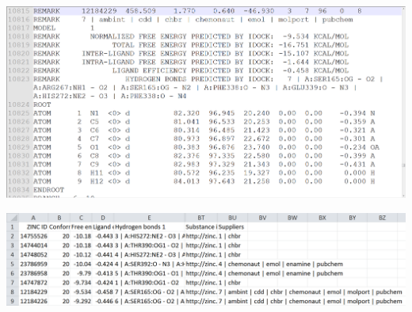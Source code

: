 \documentclass[12pt]{article}
\begin{document}
\clearpage

\begin{center}
\begin{figure}
\centering
{}
\\
\end{figure}
\end{center}

\clearpage

\begin{center}
\includegraphics[width=\linewidth,keepaspectratio=true]{OutputPDBQT.png}
\end{center}

\clearpage

\begin{center}
\includegraphics[width=\linewidth,keepaspectratio=true]{OutputCSV.png}
\end{center}
\end{document}

